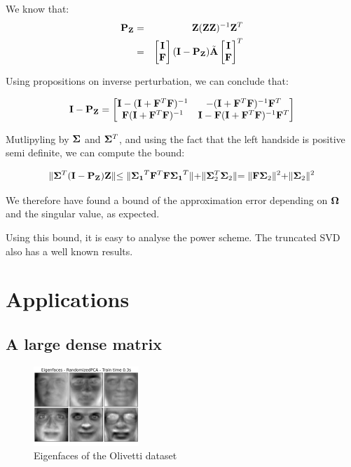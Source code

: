 \documentclass[onecolumn,12pt]{article}
\begin{document}
We know that:
\begin{align}
\bold{P_Z} & = & \bold{Z} (\bold{Z} \bold{Z})^{-1} \bold{Z}^T \\
	   & = &
	   \begin{bmatrix}
	   \bold{I} \\
	   \bold{F}
	   \end{bmatrix} (\bold{I} - \bold{P_Z}) \tilde{\bold{A}}
	   \begin{bmatrix}
	   \bold{I} \\
	   \bold{F}
	   \end{bmatrix}^T
\end{align}

Using propositions on inverse perturbation, we can conclude that:

\begin{equation}
\bold{I} - \bold{P_Z} =
    \begin{bmatrix}
    \bold{I} - (\bold{I} + \bold{F}^T \bold{F})^{-1} & - (\bold{I} +
    \bold{F}^T \bold{F})^{-1}\bold{F}^T \\
    \bold{F}(\bold{I} + \bold{F}^T \bold{F})^{-1}  & \bold{I} -
    \bold{F}(\bold{I} + \bold{F}^T \bold{F})^{-1} \bold{F}^T
    \end{bmatrix}
\end{equation}

Mutlipyling by $\bold{\Sigma}$ and $\bold{\Sigma}^T$, and using the fact that
the left handside is positive semi definite, we can compute the bound:

\begin{equation}
\lVert \bold{\Sigma}^T (\bold{I} - \bold{P_Z}) \bold{Z} \lVert \leq
\lVert \bold{\Sigma_1}^T \bold{F}^T \bold{F} \bold{\Sigma_1}^T\lVert +
\lVert \bold{\Sigma}_2^T \bold{\Sigma}_2 \lVert  =
\lVert \bold{F} \bold{\Sigma}_ 2\lVert^2 + \lVert \bold{\Sigma}_2 \lVert^2
\end{equation}

We therefore have found a bound of the approximation error depending on
$\bold{\Omega}$ and the singular value, as expected.

Using this bound, it is easy to analyse the power scheme. The truncated SVD
also has a well known results.

\section{Applications}
\subsection{A large dense matrix}
\begin{figure}[h]
\label{eigenfaces}
\caption{Eigenfaces of the Olivetti dataset}
\includegraphics[width=150px]{./images/plot_faces_decomposition_2.png}
\end{figure}
\end{document}
